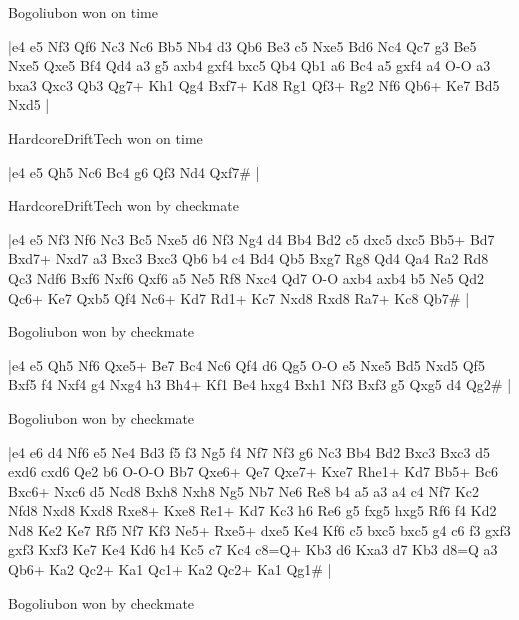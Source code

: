\showboard

Bogoliubon won on time

\makegametitle
|e4 e5 Nf3 Qf6 Nc3 Nc6 Bb5 Nb4 d3 Qb6 Be3 c5 Nxe5 Bd6 Nc4 Qc7 g3 Be5 Nxe5 Qxe5 Bf4 Qd4 a3 g5 axb4 gxf4 bxc5 Qb4 Qb1 a6 Bc4 a5 gxf4 a4 O-O a3 bxa3 Qxc3 Qb3 Qg7+ Kh1 Qg4 Bxf7+ Kd8 Rg1 Qf3+ Rg2 Nf6 Qb6+ Ke7 Bd5 Nxd5  |

\showboard

HardcoreDriftTech won on time

\makegametitle
|e4 e5 Qh5 Nc6 Bc4 g6 Qf3 Nd4 Qxf7\#  |

\showboard

HardcoreDriftTech won by checkmate

\makegametitle
|e4 e5 Nf3 Nf6 Nc3 Bc5 Nxe5 d6 Nf3 Ng4 d4 Bb4 Bd2 c5 dxc5 dxc5 Bb5+ Bd7 Bxd7+ Nxd7 a3 Bxc3 Bxc3 Qb6 b4 c4 Bd4 Qb5 Bxg7 Rg8 Qd4 Qa4 Ra2 Rd8 Qc3 Ndf6 Bxf6 Nxf6 Qxf6 a5 Ne5 Rf8 Nxc4 Qd7 O-O axb4 axb4 b5 Ne5 Qd2 Qc6+ Ke7 Qxb5 Qf4 Nc6+ Kd7 Rd1+ Kc7 Nxd8 Rxd8 Ra7+ Kc8 Qb7\#  |

\showboard

Bogoliubon won by checkmate

\makegametitle
|e4 e5 Qh5 Nf6 Qxe5+ Be7 Bc4 Nc6 Qf4 d6 Qg5 O-O e5 Nxe5 Bd5 Nxd5 Qf5 Bxf5 f4 Nxf4 g4 Nxg4 h3 Bh4+ Kf1 Be4 hxg4 Bxh1 Nf3 Bxf3 g5 Qxg5 d4 Qg2\#  |

\showboard

Bogoliubon won by checkmate

\makegametitle
|e4 e6 d4 Nf6 e5 Ne4 Bd3 f5 f3 Ng5 f4 Nf7 Nf3 g6 Nc3 Bb4 Bd2 Bxc3 Bxc3 d5 exd6 cxd6 Qe2 b6 O-O-O Bb7 Qxe6+ Qe7 Qxe7+ Kxe7 Rhe1+ Kd7 Bb5+ Bc6 Bxc6+ Nxc6 d5 Ncd8 Bxh8 Nxh8 Ng5 Nb7 Ne6 Re8 b4 a5 a3 a4 c4 Nf7 Kc2 Nfd8 Nxd8 Kxd8 Rxe8+ Kxe8 Re1+ Kd7 Kc3 h6 Re6 g5 fxg5 hxg5 Rf6 f4 Kd2 Nd8 Ke2 Ke7 Rf5 Nf7 Kf3 Ne5+ Rxe5+ dxe5 Ke4 Kf6 c5 bxc5 bxc5 g4 c6 f3 gxf3 gxf3 Kxf3 Ke7 Ke4 Kd6 h4 Kc5 c7 Kc4 c8=Q+ Kb3 d6 Kxa3 d7 Kb3 d8=Q a3 Qb6+ Ka2 Qc2+ Ka1 Qc1+ Ka2 Qc2+ Ka1 Qg1\#  |

\showboard

Bogoliubon won by checkmate

